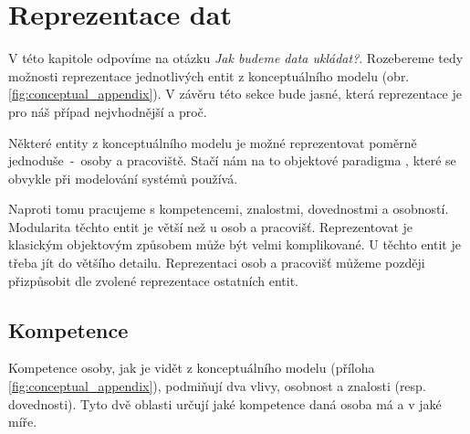 \chapter{Reprezentace dat} \label{chap:data_representation}
V této kapitole odpovíme na otázku \textit{Jak budeme data ukládat?}. Rozebereme tedy možnosti reprezentace jednotlivých entit z konceptuálního modelu (obr. \ref{fig:conceptual_appendix}). V závěru této sekce bude jasné, která reprezentace je pro náš případ nejvhodnější a proč.\par
Některé entity z konceptuálního modelu je možné reprezentovat poměrně jednoduše~-~osoby a pracoviště. Stačí nám na to objektové paradigma \cite{Wegner:object_oriented}, které se obvykle při modelování systémů používá.\par
Naproti tomu pracujeme s kompetencemi, znalostmi, dovednostmi a osobností. Modularita těchto entit je větší než u osob a pracovišť. Reprezentovat je klasickým objektovým způsobem může být velmi komplikované. U těchto entit je třeba jít do většího detailu. Reprezentaci osob a pracovišť můžeme později přizpůsobit dle zvolené reprezentace ostatních entit.\par

\section{Kompetence}
Kompetence osoby, jak je vidět z konceptuálního modelu (příloha \ref{fig:conceptual_appendix}), podmiňují dva vlivy, osobnost a znalosti (resp. dovednosti). Tyto dvě oblasti určují jaké kompetence daná osoba má a v jaké míře.\par
